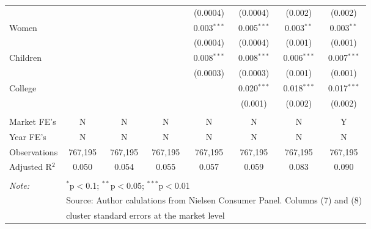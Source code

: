 \begin{table}[!htbp]
\begin{tabular}{@{\extracolsep{5pt}}lccccccc}
  &  &  &  & (0.0004) & (0.0004) & (0.002) & (0.002) \\ 
  Women &  &  &  & 0.003$^{***}$ & 0.005$^{***}$ & 0.003$^{**}$ & 0.003$^{**}$ \\ 
  &  &  &  & (0.0004) & (0.0004) & (0.001) & (0.001) \\ 
  Children &  &  &  & 0.008$^{***}$ & 0.008$^{***}$ & 0.006$^{***}$ & 0.007$^{***}$ \\ 
  &  &  &  & (0.0003) & (0.0003) & (0.001) & (0.001) \\ 
  College &  &  &  &  & 0.020$^{***}$ & 0.018$^{***}$ & 0.017$^{***}$ \\ 
  &  &  &  &  & (0.001) & (0.002) & (0.002) \\ 
 \hline \\[-1.8ex] 
Market FE's & N & N & N & N & N & N & Y \\ 
Year FE's & N & N & N & N & N & N & N \\ 
Observations & 767,195 & 767,195 & 767,195 & 767,195 & 767,195 & 767,195 & 767,195 \\ 
Adjusted R$^{2}$ & 0.050 & 0.054 & 0.055 & 0.057 & 0.059 & 0.083 & 0.090 \\ 
\hline 
\hline \\[-1.8ex] 
\textit{Note:}  & \multicolumn{7}{l}{$^{*}$p$<$0.1; $^{**}$p$<$0.05; $^{***}$p$<$0.01} \\ 
 & \multicolumn{7}{l}{Source: Author calulations from Nielsen Consumer Panel. Columns (7) and (8) } \\ 
 & \multicolumn{7}{l}{cluster standard errors at the market level} \\ 
\end{tabular} 
\end{table} 

